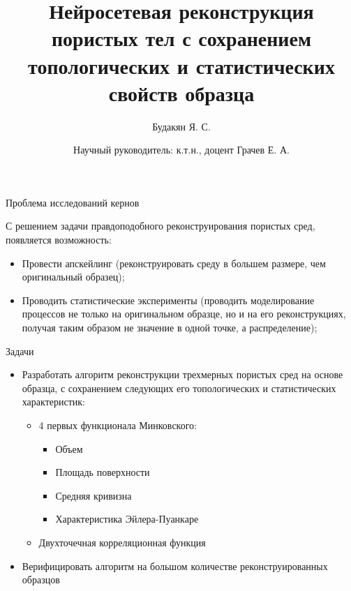 \documentclass[10pt, handout, aspectratio=169]{beamer}
\begin{document}
	\title{Нейросетевая реконструкция пористых тел с сохранением топологических и статистических свойств образца}
	\author{Будакян Я. С. \and \break \break \break Научный руководитель: к.т.н., доцент Грачев Е. А.}
	\maketitle
	
	\begin{frame}{Проблема исследований кернов}
		\begin{itemize}
			
		\end{itemize}
	С решением задачи правдоподобного реконструирования пористых сред, появляется возможность:
		\begin{itemize}
			\item Провести апскейлинг (реконструировать среду в большем размере, чем оригинальный образец);
			\item Проводить статистические эксперименты (проводить моделирование процессов не только на оригинальном образце, но и на его реконструкциях, получая таким образом не значение в одной точке, а распределение);
		\end{itemize}
	\end{frame}

	\begin{frame}{Задачи}
		\begin{itemize}
			\item Разработать алгоритм реконструкции трехмерных пористых сред на основе образца, с сохранением следующих его топологических и статистических характеристик:
			\begin{itemize}
				\item 4 первых функционала Минковского:
				\begin{itemize}
					\item Объем
					\item Площадь поверхности
					\item Средняя кривизна
					\item Характеристика Эйлера-Пуанкаре
				\end{itemize}
				\item Двухточечная корреляционная функция
			\end{itemize}
			\item Верифицировать алгоритм на большом количестве реконструированных образцов
		\end{itemize}
	\end{frame}
\end{document}

